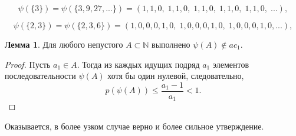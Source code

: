 \documentclass[a4paper,openbib]{article}
\renewcommand{\leq}{\leqslant}
\theoremstyle{definition}
\newtheorem{lemma}{Лемма}[section]
\begin{document}
\begin{equation}
	\psi(\{3\}) = \psi(\{3,9,27,...\}) = (1,1,0,\;1,1,0,\;1,1,0,\;1,1,0,\;1,1,0,\;...),
\end{equation}

\begin{equation}
	\psi(\{2,3\}) = \psi(\{2,3,6\}) = (1,0,0,0,1,0,\;1,0,0,0,1,0,\;1,0,0,0,1,0,...),
\end{equation}


\begin{lemma}
	Для любого непустого $A\subset \mathbb{N} $ выполнено $\psi(A) \notin ac_1$.
\end{lemma}
\begin{proof}
	Пусть $a_1\in A$.
	Тогда из каждых идущих подряд $a_1$ элементов последовательности $\psi(A)$
	хотя бы один нулевой,
	следовательно,
	\begin{equation}
		p(\psi(A)) \leq \frac{a_1-1}{a_1} < 1
		.
	\end{equation}
\end{proof}

Оказывается, в более узком случае верно и более сильное утверждение.
\end{document}
